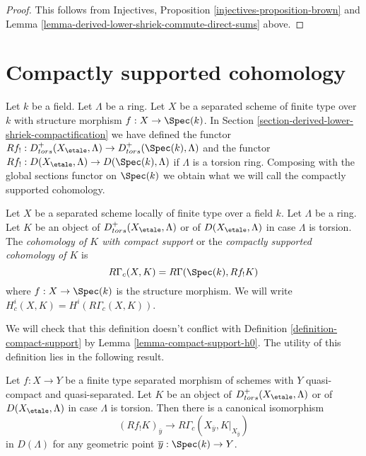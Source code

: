 \begin{proof}
This follows from
Injectives, Proposition \ref{injectives-proposition-brown}
and Lemma \ref{lemma-derived-lower-shriek-commute-direct-sums} above.
\end{proof}







\section{Compactly supported cohomology}
\label{section-compactly-supported-cohomology}

\noindent
Let $k$ be a field. Let $\Lambda$ be a ring. Let $X$ be a separated scheme
of finite type over $k$ with structure morphism $f : X \to \Spec(k)$.
In Section \ref{section-derived-lower-shriek-compactification}
we have defined the functor
$Rf_! : D^+_{tors}(X_\etale, \Lambda) \to D^+_{tors}(\Spec(k), \Lambda)$
and the functor $Rf_! : D(X_\etale, \Lambda) \to D(\Spec(k), \Lambda)$
if $\Lambda$ is a torsion ring. Composing with the global sections functor
on $\Spec(k)$ we obtain what we will call the compactly supported cohomology.

\begin{definition}
\label{definition-cohomology-compact-support}
Let $X$ be a separated scheme locally of finite type over a field $k$.
Let $\Lambda$ be a ring. Let $K$ be an object of
$D^+_{tors}(X_\etale, \Lambda)$
or of $D(X_\etale, \Lambda)$ in case $\Lambda$ is torsion.
The {\it cohomology of $K$ with compact support} or the
{\it compactly supported cohomology of $K$} is
$$
R\Gamma_c(X, K) = R\Gamma(\Spec(k), Rf_!K)
$$
where $f : X \to \Spec(k)$ is the structure morphism. We will
write  $H^i_c(X, K) = H^i(R\Gamma_c(X, K))$.
\end{definition}

\noindent
We will check that this definition doesn't conflict with
Definition \ref{definition-compact-support} by
Lemma \ref{lemma-compact-support-h0}.
The utility of this definition lies in the following result.

\begin{lemma}
\label{lemma-stalk-R-f-shriek}
Let $f : X \to Y$ be a finite type separated morphism of schemes
with $Y$ quasi-compact and quasi-separated. Let $K$ be an object of
$D^+_{tors}(X_\etale, \Lambda)$ or of $D(X_\etale, \Lambda)$ in case
$\Lambda$ is torsion. Then there is a canonical isomorphism
$$
(Rf_!K)_{\overline{y}}
\longrightarrow
R\Gamma_c(X_{\overline{y}}, K|_{X_{\overline{y}}})
$$
in $D(\Lambda)$ for any geometric point $\overline{y} : \Spec(k) \to Y$.
\end{lemma}


